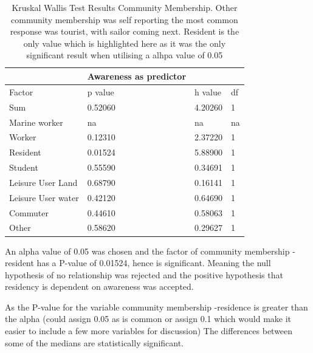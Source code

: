 \begin{table}[h]
    \centering
    \begin{tabular}{|l|l|l|l|}
    \hline
         ~ &Awareness as predictor & ~ & ~ \\ \hline
        Factor & p value & h value & df \\ \hline
        Sum & 0.52060 & 4.20260 & 1 \\ \hline
        Marine worker & na & na & na \\ \hline
        Worker & 0.12310 & 2.37220 & 1 \\ \hline
        Resident & \cellcolor[HTML]{7df9ff} 0.01524 & 5.88900 & 1 \\ \hline
        Student & 0.55590 & 0.34691 & 1 \\ \hline
        Leisure User Land & 0.68790 & 0.16141 & 1 \\ \hline
        Leisure User water & 0.42120 & 0.64690 & 1 \\ \hline
        Commuter & 0.44610 & 0.58063 & 1 \\ \hline
        Other & 0.58620 & 0.29627 & 1 \\ \hline
    \end{tabular}
    \caption{Kruskal Wallis Test Results Community Membership. Other community membership was self reporting the most common response was tourist, with sailor coming next. Resident is the only value which is highlighted here as it was the only significant result when utilising a alhpa value of 0.05}
    \label{Kruskal_wallis_test_general}
\end{table}

An alpha value of 0.05 was chosen and the factor of community membership - resident has a P-value of 0.01524, hence is significant. Meaning the null hypothesis of no relationship was rejected and the positive hypothesis that residency is dependent on awareness was accepted. 




As the P-value for the variable community membership -residence is greater than the alpha (could assign 0.05 as is common or assign 0.1 which would make it easier to include a few more variables for discussion) The differences between some of the medians are statistically significant.


